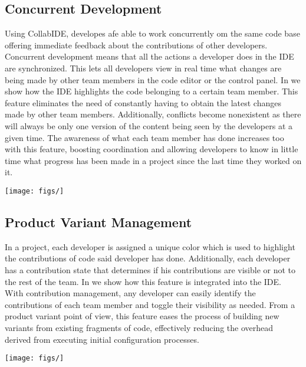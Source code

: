 \subsection{Concurrent Development}
Using CollabIDE, developes afe able to work concurrently om the same code base offering immediate feedback about the contributions of other developers.
Concurrent development means that all the actions a developer does in the IDE are synchronized. This lets all developers view in real time what changes are being made by other team members in the code editor or the control panel. In  we show how the IDE highlights the code belonging to a certain team member. This feature eliminates the need of constantly having to obtain the latest changes made by other team members. Additionally, conflicts become nonexistent as there will always be only one version of the content being seen by the developers at a given time. The awareness of what each team member has done increases too with this feature, boosting coordination and allowing developers to know in little time what progress has been made in a project since the last time they worked on it. 

\begin{graphics}[htbp]
  \centering
  \texttt{[image: figs/]}
  \caption{}
  \label{fig:}
\end{graphics}


\subsection{Product Variant Management}
In a project, each developer is assigned a unique color which is used to highlight the contributions of code said developer has done. Additionally, each developer has a contribution state that determines if his contributions are visible or not to the rest of the team. In  we show how this feature is integrated into the IDE. With contribution management, any developer can easily identify the contributions of each team member and toggle their visibility as needed. From a product variant point of view, this feature eases the process of building new variants from existing fragments of code, effectively reducing the overhead derived from executing initial configuration processes.

\begin{graphics}[htbp]
  \centering
  \texttt{[image: figs/]}
  \caption{}
  \label{fig:}
\end{graphics}


